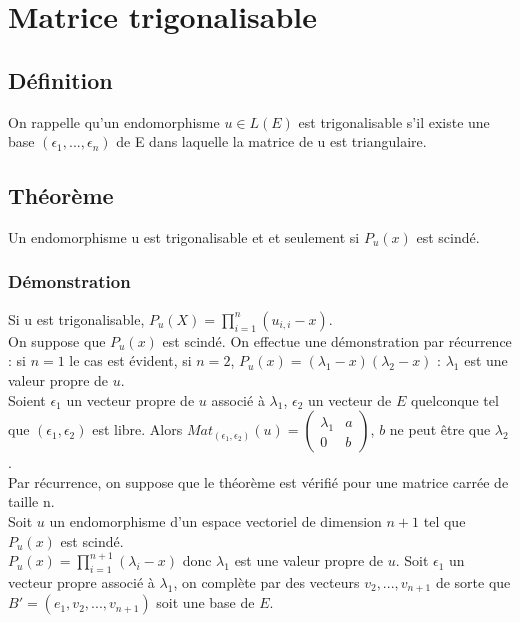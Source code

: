 \documentclass[a4paper,10pt]{book} %
\newcommand{\ev}{espace vectoriel }
\newcommand{\displayAmath}{\displaystyle}
\begin{document}
\newpage

\section{Matrice trigonalisable}
\subsection{Définition}
On rappelle qu'un endomorphisme $u\in L(E)$ est trigonalisable s'il existe une base $(\epsilon_1,...,\epsilon_n)$ de E dans laquelle la matrice de u est triangulaire.

\subsection{Théorème}
Un endomorphisme u est trigonalisable et et seulement si $P_u(x)$ est scindé.

\subsubsection{Démonstration}
Si u est trigonalisable, $P_u(X)=\prod_{i=1}^n(u_{i,i}-x)$.\\

On suppose que $P_u(x)$ est scindé. On effectue une démonstration par récurrence : si $n=1$ le cas est évident, si $n=2$, $P_u(x)=(\lambda_1-x)(\lambda_2-x)$ : $\lambda_1$ est une valeur propre de $u$.\\

Soient $\epsilon_1$ un vecteur propre de $u$ associé à $\lambda_1$, $\epsilon_2$ un vecteur de $E$ quelconque tel que $(\epsilon_1,\epsilon_2)$ est libre. Alors $Mat_{(\epsilon_1,\epsilon_2)}(u)=\begin{pmatrix}
\lambda_1&a\\0&b
\end{pmatrix}$, $b$ ne peut être que $\lambda_2$.\\

Par récurrence, on suppose que le théorème est vérifié pour une matrice carrée de taille n.\\

Soit $u$ un endomorphisme d'un \ev de dimension $n+1$ tel que $P_u(x)$ est scindé.\\

$\displayAmath P_u(x)=\prod_{i=1}^{n+1}(\lambda_i-x)$ donc $\lambda_1$ est une valeur propre de $u$. Soit $\epsilon_1$ un vecteur propre associé à $\lambda_1$, on complète par des vecteurs $v_2,...,v_{n+1}$ de sorte que $B'=(e_1,v_2,...,v_{n+1})$ soit une base de $E$.\\
\end{document}
